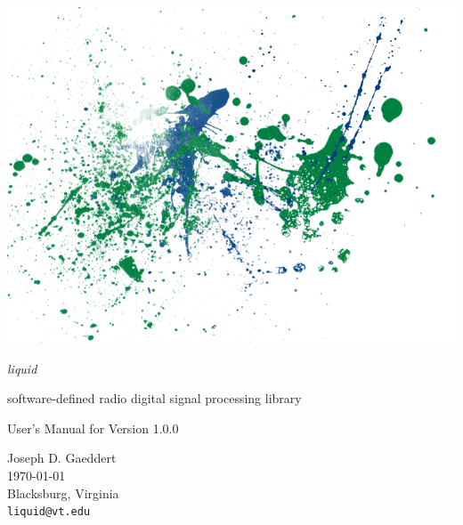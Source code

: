 \documentclass[11pt,twoside]{article}
\begin{document}



%
%
\thispagestyle{empty}
\begin{center}
\includegraphics[width=\textwidth]{graphics/liquid_splatter_00.png}
\end{center}

\vfill

\noindent
{\huge\it liquid}

\noindent
software-defined radio digital signal processing library

\vfill

\noindent
User's Manual for Version 1.0.0

\vfill

\noindent
Joseph D. Gaeddert \\
\today \\
Blacksburg, Virginia \\
{\tt liquid@vt.edu}

\end{document}
